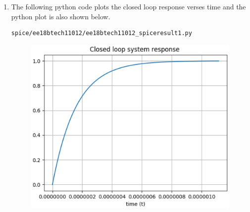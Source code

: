\begin{enumerate}[label=\thesubsection.\arabic*.,ref=\thesubsection.\theenumi]
\begin{figure}[!h]
\caption{}
\label{fig:ee18btech11012_spiceresult}
\end{figure}
\item The following python code plots the closed loop response verses time and the python plot is also shown below.
\begin{lstlisting}
spice/ee18btech11012/ee18btech11012_spiceresult1.py
\end{lstlisting}
\begin{figure}[!h]
\centering
\includegraphics[width=\columnwidth]{./figs/ee18btech11012_1/ee18btech11012_spiceresult1.eps}
\caption{}
\label{fig:ee18btech11012_spiceresult1}
\end{figure}

\end{enumerate}
